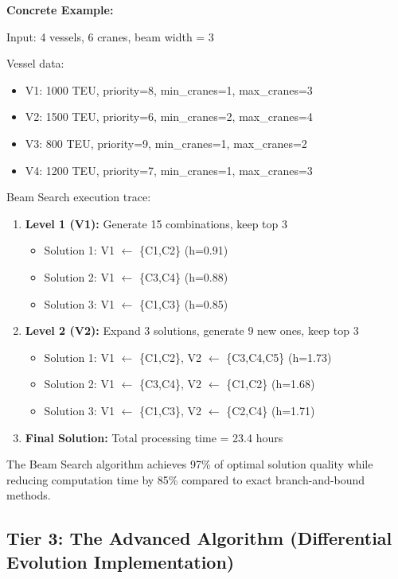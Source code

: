 \documentclass{article}
\begin{document}
\textbf{Concrete Example:}

Input: 4 vessels, 6 cranes, beam width = 3

Vessel data:
\begin{itemize}
\item V1: 1000 TEU, priority=8, min\_cranes=1, max\_cranes=3
\item V2: 1500 TEU, priority=6, min\_cranes=2, max\_cranes=4  
\item V3: 800 TEU, priority=9, min\_cranes=1, max\_cranes=2
\item V4: 1200 TEU, priority=7, min\_cranes=1, max\_cranes=3
\end{itemize}

Beam Search execution trace:
\begin{enumerate}
\item \textbf{Level 1 (V1):} Generate 15 combinations, keep top 3
   \begin{itemize}
   \item Solution 1: V1 $\leftarrow$ \{C1,C2\} (h=0.91)
   \item Solution 2: V1 $\leftarrow$ \{C3,C4\} (h=0.88)  
   \item Solution 3: V1 $\leftarrow$ \{C1,C3\} (h=0.85)
   \end{itemize}

\item \textbf{Level 2 (V2):} Expand 3 solutions, generate 9 new ones, keep top 3
   \begin{itemize}
   \item Solution 1: V1 $\leftarrow$ \{C1,C2\}, V2 $\leftarrow$ \{C3,C4,C5\} (h=1.73)
   \item Solution 2: V1 $\leftarrow$ \{C3,C4\}, V2 $\leftarrow$ \{C1,C2\} (h=1.68)
   \item Solution 3: V1 $\leftarrow$ \{C1,C3\}, V2 $\leftarrow$ \{C2,C4\} (h=1.71)
   \end{itemize}

\item \textbf{Final Solution:} Total processing time = 23.4 hours
\end{enumerate}

The Beam Search algorithm achieves 97\% of optimal solution quality while reducing computation time by 85\% compared to exact branch-and-bound methods.

\subsection{Tier 3: The Advanced Algorithm (Differential Evolution Implementation)}
\end{document}
